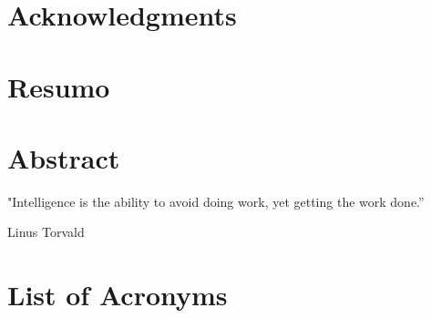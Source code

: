 \documentclass[a4paper, 11pt]{report}
\begin{document}



\newpage
\thispagestyle{empty}
\mbox{}

\chapter*{Acknowledgments}


\chapter*{Resumo}


\chapter*{Abstract}

\newpage\null\thispagestyle{empty}\newpage

\setlength\epigraphwidth{12cm}
\setlength\epigraphrule{0pt}
\makeatletter
{}
\makeatother
\vspace*{\fill}
\epigraph{"Intelligence is the ability to avoid doing work, yet getting the work done.”}
{Linus Torvald}
\vspace*{\fill}
\newpage\null\thispagestyle{empty}\newpage
\pagestyle{plain}
\tableofcontents
\chapter*{List of Acronyms}

\listoffigures
\listoftables
\newpage
\thispagestyle{empty}
\mbox{}

\end{document}
